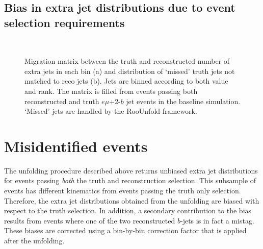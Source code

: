 \subsection{Bias in extra jet distributions due to event selection requirements}
\begin{figure}
~
~
\caption{Migration matrix between the truth and reconstructed number of extra jets in each bin (a) and distribution of `missed' truth jets not matched to reco jets (b). Jets are binned according to both \pt value and rank. The matrix is filled from events passing both reconstructed and truth $e\mu$+2-$b$ jet events in the baseline \ttbar simulation. `Missed' jets are handled by the RooUnfold framework.}
\label{f:res}
\end{figure}
\label{sec:misid}
% 

\section{Misidentified events}
The unfolding procedure described above returns unbiased extra jet distributions for
events passing \textit{ both} the truth and reconstruction selection.  This subsample of events has
different kinematics from events passing the truth only selection.  Therefore, the extra jet
distributions obtained from the unfolding are biased with respect to the truth selection.
In addition, a secondary contribution to the bias results from events where one of the two reconstructed
$b$-jets is in fact a mistag.
These biases are corrected using a bin-by-bin correction factor that is applied after the unfolding. 

